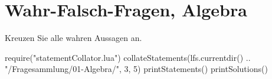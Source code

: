 \documentclass[10pt]{article}
\newcommand*{\Oberthema}{01-Algebra}
\begin{document}
\section*{Wahr-Falsch-Fragen, Algebra}
Kreuzen Sie alle wahren Aussagen an.

\clearpage

\begin{luacode}
  require("statementCollator.lua")
  collateStatements(lfs.currentdir() .. "/Fragesammlung/\Oberthema/", 3, 5)
  printStatements()
  printSolutions()
\end{luacode}
\end{document}
